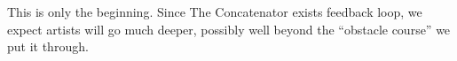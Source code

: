 \documentclass{article}
\begin{document}
This is only the beginning. Since The Concatenator exists feedback loop, we expect artists will go much deeper, possibly well beyond the ``obstacle course'' we put it through.



%
%
%
%
%
\end{document}
